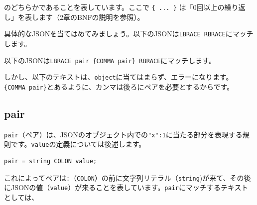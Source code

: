 のどちらかであることを表しています。ここで \texttt{\{\ ...\ \}}
は「0回以上の繰り返し」を表します（2章のBNFの説明を参照）。

具体的なJSONを当てはめてみましょう。以下のJSONは\texttt{LBRACE\ RBRACE}にマッチします。

\begin{Shaded}
\begin{Highlighting}[]
\NormalTok{\{\}}
\end{Highlighting}
\end{Shaded}

以下のJSONは\texttt{LBRACE\ pair\ \{COMMA\ pair\}\ RBRACE}にマッチします。

\begin{Shaded}
\begin{Highlighting}[]
\NormalTok{\{}\OperatorTok{:}\NormalTok{\}}
\NormalTok{\{}\OperatorTok{:}\OperatorTok{,}\OperatorTok{:}\NormalTok{\}}
\NormalTok{\{}\OperatorTok{:}\OperatorTok{,}\OperatorTok{:}\OperatorTok{,}\OperatorTok{:}\NormalTok{\}}
\end{Highlighting}
\end{Shaded}

しかし、以下のテキストは、\texttt{object}に当てはまらず、エラーになります。\texttt{\{COMMA\ pair\}}とあるように、カンマは後ろにペアを必要とするからです。

\begin{Shaded}
\begin{Highlighting}[]
\NormalTok{\{}\OperatorTok{:}\OperatorTok{,}\NormalTok{\} }
\end{Highlighting}
\end{Shaded}

\hypertarget{chapter3-pair}{%
\subsection{pair}\label{chapter3-pair}}

\texttt{pair}（ペア）は、JSONのオブジェクト内での\texttt{"x":1}に当たる部分を表現する規則です。\texttt{value}の定義については後述します。

\begin{verbatim}
pair = string COLON value;
\end{verbatim}

これによってペアは\texttt{:}（\texttt{COLON}）の前に文字列リテラル（\texttt{string})が来て、その後にJSONの値（\texttt{value}）が来ることを表しています。\texttt{pair}にマッチするテキストとしては、

